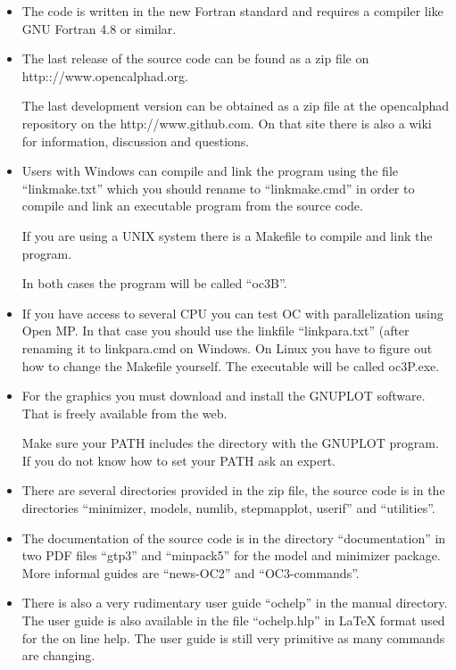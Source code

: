 \documentclass[12pt]{article}
\begin{document}
\begin{itemize}
\item The code is written in the new Fortran standard and requires a
  compiler like GNU Fortran 4.8 or similar.

\item The last release of the source code can be found as a zip file
  on http:://www.opencalphad.org.

  The last development version can be obtained as a zip file at the
  opencalphad repository on the http://www.github.com.  On that site
  there is also a wiki for information, discussion and questions.

\item Users with Windows can compile and link the program using the
  file ``linkmake.txt'' which you should rename to ``linkmake.cmd'' in
  order to compile and link an executable program from the source
  code.

  If you are using a UNIX system there is a Makefile to compile and link
  the program.

  In both cases the program will be called ``oc3B''.

\item If you have access to several CPU you can test OC with
  parallelization using Open MP.  In that case you should use the
  linkfile ``linkpara.txt'' (after renaming it to linkpara.cmd on
  Windows.  On Linux you have to figure out how to change the Makefile
  yourself.  The executable will be called oc3P.exe.

\item For the graphics you must download and install the GNUPLOT
  software.  That is freely available from the web.

  Make sure your PATH includes the directory with the GNUPLOT program.
  If you do not know how to set your PATH ask an expert.

\item There are several directories provided in the zip file, the
  source code is in the directories ``minimizer, models, numlib,
  stepmapplot, userif'' and ``utilities''.

\item The documentation of the source code is in the directory
  ``documentation'' in two PDF files ``gtp3'' and ``minpack5'' for the
  model and minimizer package.
More informal guides are ``news-OC2'' and
  ``OC3-commands''.

\item There is also a very rudimentary user guide ``ochelp'' in the
  manual directory.  The user guide is also available in the file
  ``ochelp.hlp'' in LaTeX format used for the on line help.  The user
  guide is still very primitive as many commands are changing.


\end{itemize}
\end{document}
